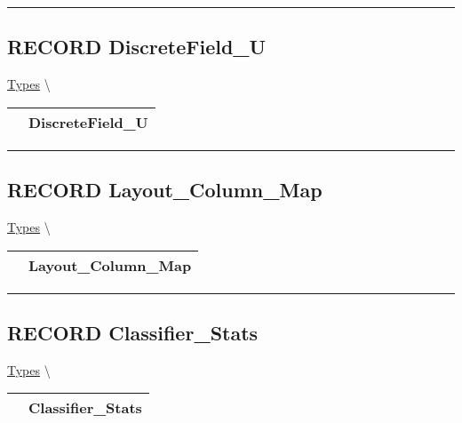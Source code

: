 \par


\rule{\linewidth}{0.5pt}
\subsection*{\textsf{\colorbox{headtoc}{\color{white} RECORD}
DiscreteField\_U}}

\hypertarget{ecldoc:types.discretefield_u}{}
\hspace{0pt} \hyperlink{ecldoc:Types}{Types} \textbackslash 

{\renewcommand{\arraystretch}{1.5}
\begin{tabularx}{\textwidth}{|>{\raggedright\arraybackslash}l|X|}
\hline
\hspace{0pt}\mytexttt{\color{red} } & \textbf{DiscreteField\_U} \\
\hline
\end{tabularx}
}

\par


\rule{\linewidth}{0.5pt}
\subsection*{\textsf{\colorbox{headtoc}{\color{white} RECORD}
Layout\_Column\_Map}}

\hypertarget{ecldoc:types.layout_column_map}{}
\hspace{0pt} \hyperlink{ecldoc:Types}{Types} \textbackslash 

{\renewcommand{\arraystretch}{1.5}
\begin{tabularx}{\textwidth}{|>{\raggedright\arraybackslash}l|X|}
\hline
\hspace{0pt}\mytexttt{\color{red} } & \textbf{Layout\_Column\_Map} \\
\hline
\end{tabularx}
}

\par


\rule{\linewidth}{0.5pt}
\subsection*{\textsf{\colorbox{headtoc}{\color{white} RECORD}
Classifier\_Stats}}

\hypertarget{ecldoc:types.classifier_stats}{}
\hspace{0pt} \hyperlink{ecldoc:Types}{Types} \textbackslash 

{\renewcommand{\arraystretch}{1.5}
\begin{tabularx}{\textwidth}{|>{\raggedright\arraybackslash}l|X|}
\hline
\hspace{0pt}\mytexttt{\color{red} } & \textbf{Classifier\_Stats} \\
\hline
\end{tabularx}
}

